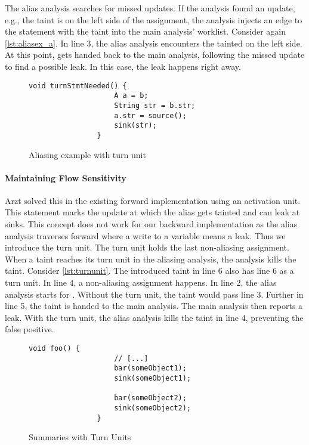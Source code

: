 \documentclass[../draft.tex]{subfiles}
\begin{document}
    The alias analysis searches for missed updates. If the analysis found an update, e.g., the taint is on the left side of the assignment, the analysis injects an edge to the statement with the taint into the main analysis' worklist. Consider again \autoref{lst:aliasex_a}. In line 3, the alias analysis encounters the tainted  on the left side. At this point,  gets handed back to the main analysis, following the missed update to find a possible leak. In this case, the leak happens right away.

    \begin{figure}[tbp]
        \centering
        \begin{adjustbox}{max width=\columnwidth}
            \begin{lstlisting}[gobble=16]
                void turnStmtNeeded() {
                    A a = b;
                    String str = b.str;
                    a.str = source();
                    sink(str);
                }
            \end{lstlisting}
        \end{adjustbox}
        \caption{Aliasing example with turn unit}
        \label{lst:turnunit}
    \end{figure}

    \paragraph{Maintaining Flow Sensitivity}
    Arzt solved this in the existing forward implementation using an activation unit. This statement marks the update at which the alias gets tainted and can leak at sinks. This concept does not work for our backward implementation as the alias analysis traverses forward where a write to a variable means a leak. Thus we introduce the turn unit. The turn unit holds the last non-aliasing assignment. When a taint reaches its turn unit in the aliasing analysis, the analysis kills the taint. Consider \autoref{lst:turnunit}. The introduced taint  in line 6 also has line 6 as a turn unit. In line 4, a non-aliasing assignment happens. In line 2, the alias analysis starts for . Without the turn unit, the taint would pass line 3. Further in line 5, the taint is handed to the main analysis. The main analysis then reports a leak. With the turn unit, the alias analysis kills the taint in line 4, preventing the false positive. 
    
    \begin{figure}[tbp]
        \centering
        \begin{adjustbox}{max width=\columnwidth}
            \begin{lstlisting}[gobble=16]
                void foo() {
                    // [...]
                    bar(someObject1);
                    sink(someObject1);

                    bar(someObject2);
                    sink(someObject2);
                }
            \end{lstlisting}
        \end{adjustbox}
        \caption{Summaries with Turn Units}
        \label{lst:turnunitsum}
    \end{figure}
\end{document}
